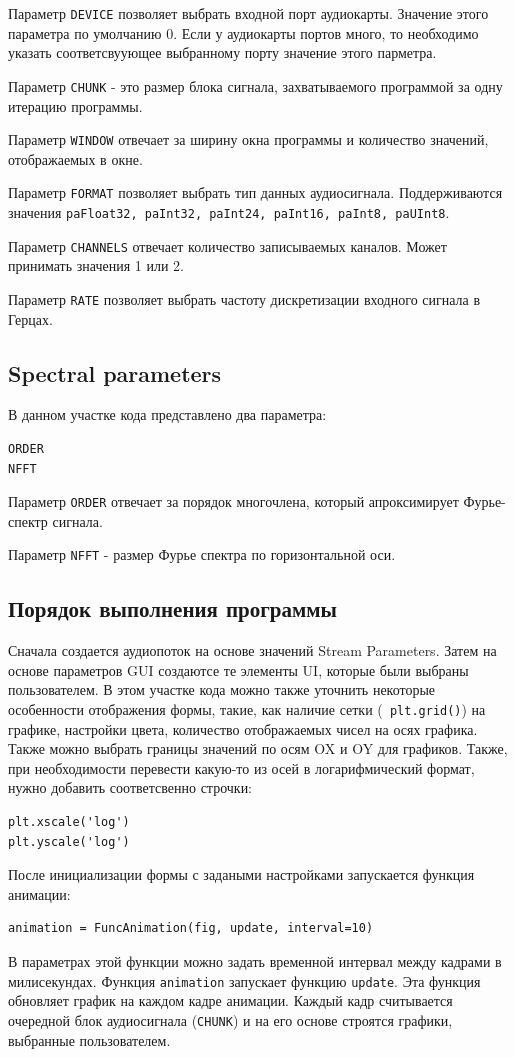 Параметр \verb|DEVICE| позволяет выбрать входной порт аудиокарты. Значение этого параметра по умолчанию 0. Если у аудиокарты портов много, то необходимо указать соответсвуующее выбранному  порту значение этого парметра. 

Параметр \verb|CHUNK| - это размер блока сигнала, захватываемого программой за одну итерацию программы. 

Параметр \verb|WINDOW| отвечает за ширину окна программы и количество значений, отображаемых в окне.

Параметр \verb|FORMAT| позволяет выбрать тип данных аудиосигнала. Поддерживаются значения  \verb|paFloat32, paInt32, paInt24, paInt16, paInt8, paUInt8|.

Параметр \verb|CHANNELS| отвечает количество записываемых каналов. Может принимать значения 1 или 2. 

Параметр \verb|RATE| позволяет выбрать частоту дискретизации входного сигнала в Герцах.

\subsection{Spectral parameters}
В данном участке кода представлено два параметра:
\begin{verbatim}
ORDER
NFFT
\end{verbatim}
Параметр \verb|ORDER| отвечает за порядок многочлена, который апроксимирует Фурье-спектр сигнала.

Параметр \verb|NFFT| - размер Фурье спектра по горизонтальной оси.
\subsection{Порядок выполнения программы}
Сначала создается аудиопоток на основе значений Stream Parameters. Затем на основе параметров GUI создаютсе те элементы UI, которые были выбраны пользователем. В этом участке кода можно также уточнить некоторые особенности отображения формы, такие, как наличие сетки (\verb| plt.grid()|) на графике, настройки цвета, количество отображаемых чисел на осях графика. Также можно выбрать границы значений по осям OX и OY для графиков. Также, при необходимости перевести какую-то из осей в логарифмический формат, нужно добавить  соответсвенно строчки:
\begin{verbatim}
plt.xscale('log')
plt.yscale('log')
\end{verbatim}

После инициализации формы с задаными настройками запускается функция анимации: 
\begin{verbatim}
animation = FuncAnimation(fig, update, interval=10)
\end{verbatim}
В параметрах этой функции можно задать временной интервал между кадрами в милисекундах. Функция \verb|animation| запускает функцию \verb|update|. Эта функция обновляет график на каждом кадре анимации. Каждый кадр считывается очередной блок аудиосигнала (\verb|CHUNK|) и на его основе строятся графики, выбранные пользователем. 

